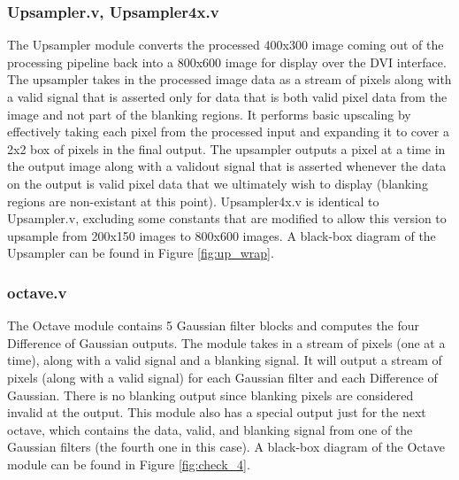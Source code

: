 \documentclass[12pt]{article}
\begin{document}
\subsubsection{Upsampler.v, Upsampler4x.v}


The Upsampler module converts the processed 400x300 image coming out of the processing
pipeline back into a 800x600 image for display over the DVI interface. The upsampler
takes in the processed image data as a stream of pixels along with a valid signal 
that is asserted only for data that is both valid pixel data from the image and
not part of the blanking regions. It performs basic upscaling by effectively taking
each pixel from the processed input and expanding it to cover a 2x2 box of 
pixels in the final output. The upsampler outputs a pixel at a time in the output 
image along with a validout signal that is asserted whenever the data on the 
output is valid pixel data that we ultimately wish to display (blanking regions
are non-existant at this point). Upsampler4x.v is identical to Upsampler.v, 
excluding some constants that are modified to allow this version to upsample 
from 200x150 images to 800x600 images. A black-box diagram of the Upsampler
can be found in Figure \ref{fig:up_wrap}.


\subsubsection{octave.v}


The Octave module contains 5 Gaussian filter blocks and computes the four 
Difference of Gaussian outputs. The module takes in a stream of pixels (one at 
a time), along with a valid signal and a blanking signal. It will output a 
stream of pixels (along with a valid signal) for each Gaussian filter and each 
Difference of Gaussian. There is no blanking output since blanking pixels are 
considered invalid at the output. This module also has a special output just 
for the next octave, which contains the data, valid, and blanking signal from 
one of the Gaussian filters (the fourth one in this case). A black-box diagram
of the Octave module can be found in Figure \ref{fig:check_4}.
\end{document}
